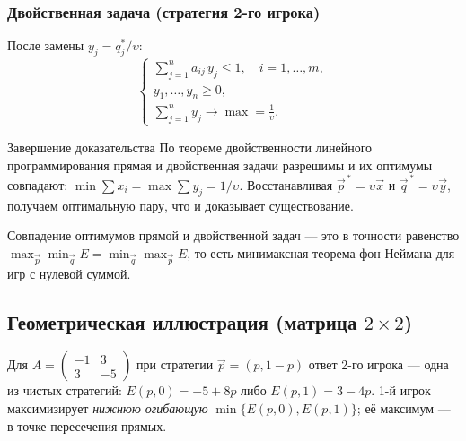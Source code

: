 \subsubsection*{Двойственная задача (стратегия 2-го игрока)}

После замены $y_j=q_j^*/\upsilon$:
\[
\begin{cases}
	\displaystyle\sum_{j=1}^n a_{ij}\,y_j\le 1,\quad i=1,\dots,m,\\[4pt]
	y_1,\dots,y_n\ge 0,\\[2pt]
	\displaystyle\sum_{j=1}^n y_j\longrightarrow\max=\tfrac{1}{\upsilon}.
\end{cases}
\]

\begin{Theorem}{Завершение доказательства}{}
	По теореме двойственности линейного программирования прямая и двойственная задачи разрешимы и их оптимумы совпадают: $\min\sum x_i=\max\sum y_j=1/\upsilon$. Восстанавливая $\vec p^{\,*}=\upsilon\vec x$ и $\vec q^{\,*}=\upsilon\vec y$, получаем оптимальную пару, что и доказывает существование.
\end{Theorem}

\begin{Remark}{}{}
	Совпадение оптимумов прямой и двойственной задач — это в точности равенство $\max_{\vec p}\min_{\vec q}E=\min_{\vec q}\max_{\vec p}E$, то есть минимаксная теорема фон Неймана для игр с нулевой суммой.
\end{Remark}

\subsection{Геометрическая иллюстрация (матрица $2\times2$)}

Для $A=\left(\begin{smallmatrix}-1&3\\3&-5\end{smallmatrix}\right)$ при стратегии $\vec p=(p,1-p)$ ответ 2-го игрока — одна из чистых стратегий: $E(p,0)=-5+8p$ либо $E(p,1)=3-4p$. 1-й игрок максимизирует \emph{нижнюю огибающую} $\min\{E(p,0),E(p,1)\}$; её максимум — в точке пересечения прямых.

